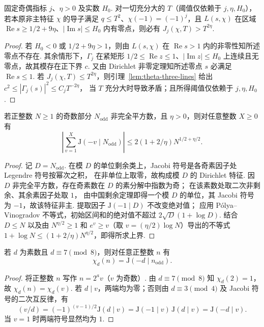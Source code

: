 \begin{lemma}[三线估计检测零点]
\label{lem:theta-detect}
\emitthmsource
固定奇偶指标 $j$、$\eta>0$ 及实数 $H_0$. 对一切充分大的 $T$（阈值仅依赖于 $j,\eta,H_0$），若本原非主特征 $\chi$ 的导子满足 $q\le T^2$、$\chi(-1)=(-1)^j$，且 $L(s,\chi)$ 在区域 $\operatorname{Re}s\ge1/2+9\eta$、$|\operatorname{Im}s|\le H_0$ 内有零点，则必有 $J_j(\chi,T)>T^{2\eta}$.
\end{lemma}
\begin{proof}
若 $H_0<0$ 或 $1/2+9\eta>1$，则由 $L(s,\chi)$ 在 $\operatorname{Re}s>1$ 内的非零性知所述零点不存在.
其余情形下，$\Gamma_j$ 在紧矩形
$1/2\le\operatorname{Re}z\le1$、$|\operatorname{Im}z|\le H_0$ 上连续且无零点，故其模存在正下界 $c$.
又由 Dirichlet 非零定理知所述零点 $s$ 必满足 $\operatorname{Re}s\le1$.
若 $J_j(\chi,T)\le T^{2\eta}$，则引理~\ref{lem:theta-three-lines} 给出
$c^2\le|\Gamma_j(s)|^2\le C_jT^{-2\eta}$，
当 $T$ 充分大时导致矛盾；且所得阈值仅依赖于 $j,\eta,H_0$.
\end{proof}

\begin{lemma}
\label{lem:jacobi-interval}
\emitthmsource
若正整数 $N\ge1$ 的奇数部分 $N_{\mathrm{odd}}$ 非完全平方数，且 $\eta>0$，则对任意整数 $X\ge0$ 有
\[
 \left|\sum_{v=1}^X\mathrm J(-v\mid N_{\mathrm{odd}})\right|
 \le 2(1+2/\eta)N^{1/2+\eta/2}.
\]
\end{lemma}
\begin{proof}
记 $D=N_{\mathrm{odd}}$. 在模 $D$ 的单位剩余类上，Jacobi 符号是各奇素因子处 Legendre 符号按幂次之积，
在非单位上取零，故构成模 $D$ 的 Dirichlet 特征.
因 $D$ 非完全平方数，存在奇素数在 $D$ 的素分解中指数为奇；
在该素数处取二次非剩余、其余素因子处取 $1$，
由中国剩余定理即得一个模 $D$ 的单位，其 Jacobi 符号为 $-1$，故该特征非主.
提取因子 $\mathrm J(-1\mid D)$ 不改变绝对值；
应用 Pólya--Vinogradov 不等式，初始区间和的绝对值不超过 $2\sqrt D(1+\log D)$.
结合 $D\le N$ 以及由 $N^{\eta/2}\ge1$ 和 $e^v\ge v$（取 $v=(\eta/2)\log N$）导出的不等式
$1+\log N\le (1+2/\eta)N^{\eta/2}$，即得所求上界.
\end{proof}

\begin{lemma}[二次符号的奇数部分公式]
\label{lem:twist-reciprocity}
\emitthmsource
若 $d$ 为素数且 $d\equiv7\pmod8$，则对任意正整数 $n$ 有
\[
 \chi_d(n)=\mathrm J(-d\mid n_{\mathrm{odd}}).
\]
\end{lemma}
\begin{proof}
将正整数 $n$ 写作 $n=2^a v$（$v$ 为奇数）. 由 $d\equiv7\pmod8$ 知
$\chi_d(2)=1$，故 $\chi_d(n)=\chi_d(v)$.
若 $d\mid v$，两端均为零；否则由 $d\equiv3\pmod4$ 及 Jacobi 符号的二次互反律，有
\[
 (v/d)=(-1)^{(v-1)/2}\mathrm J(d\mid v)
       =\mathrm J(-1\mid v)\,\mathrm J(d\mid v)
       =\mathrm J(-d\mid v).
\]
当 $v=1$ 时两端符号显然均为 $1$.
\end{proof}

